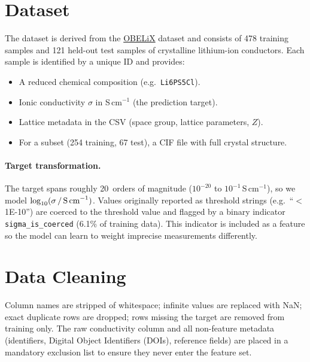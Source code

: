 \documentclass[11pt,a4paper]{article}
\newcommand{\logsigma}{\log_{10}(\sigma\,/\,\text{S\,cm}^{-1})}
\begin{document}
\section{Dataset}

The dataset is derived from the \href{https://github.com/NRC-Mila/OBELiX}{OBELiX}
dataset and consists of 478 training samples and 121 held-out test samples of
crystalline lithium-ion conductors.  Each sample is identified by a unique ID
and provides:

\begin{itemize}[leftmargin=*]
      \item A reduced chemical composition (e.g.\ \texttt{Li6PS5Cl}).
      \item Ionic conductivity $\sigma$ in S\,cm$^{-1}$ (the prediction target).
      \item Lattice metadata in the CSV (space group, lattice parameters, $Z$).
      \item For a subset (254 training, 67 test), a CIF file with full crystal
            structure.
\end{itemize}

\paragraph{Target transformation.}
The target spans roughly 20~orders of magnitude ($10^{-20}$ to
$10^{-1}$\,S\,cm$^{-1}$), so we model $\logsigma$.  Values originally
reported as threshold strings (e.g.\ ``$<$1E-10'') are coerced to the
threshold value and flagged by a binary indicator \texttt{sigma\_is\_coerced}
(6.1\% of training data).  This indicator is included as a feature so
the model can learn to weight imprecise measurements differently.

\section{Data Cleaning}

Column names are stripped of whitespace; infinite values are replaced with NaN;
exact duplicate rows are dropped; rows missing the target are removed from
training only.  The raw conductivity column and all non-feature metadata
(identifiers, Digital Object Identifiers (DOIs), reference fields) are placed in a mandatory exclusion list
to ensure they never enter the feature set.
\end{document}
